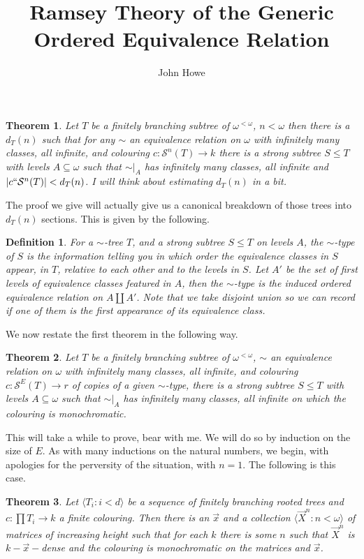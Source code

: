 \documentclass[a4paper,11pt]{article}
\author{John Howe}
\title{Ramsey Theory of the Generic Ordered Equivalence Relation}
\newtheorem{thm}{Theorem}
\newtheorem{defn}{Definition}
\begin{document}
\maketitle
\begin{thm}
Let $T$ be a finitely branching subtree of $\omega ^{<\omega}$, $n<\omega$ then there is a $d_T(n)$ such that for any $\sim$ an equivalence relation on $\omega$ with infinitely many classes, all infinite, and colouring $c: \mathcal{S}^n(T) \to k$ there is a strong subtree $S\leq T$ with levels $A\subseteq \omega$ such that $\sim |_A$ has infinitely many classes, all infinite and $|c``\mathcal{S}^n(T)|<d_T(n)$. I will think about estimating $d_T(n)$ in a bit.
\end{thm}
The proof we give will actually give us a canonical breakdown of those trees into $d_T(n)$ sections. This is given by the following.
\begin{defn}
For a $\sim $-tree $T$, and a strong subtree $S \leq T$ on levels $A$, the $\sim$-type of $S$ is the information telling you in which order the equivalence classes in $S$ appear, in $T$, relative to each other and to the levels in $S$. Let $A'$ be the set of first levels of equivalence classes featured in $A$, then the $\sim$-type is the induced ordered equivalence relation on $A\coprod A'$. Note that we take disjoint union so we can record if one of them is the first appearance of its equivalence class.
\end{defn}
We now restate the first theorem in the following way.
\begin{thm}
Let $T$ be a finitely branching subtree of $\omega ^{<\omega}$, $\sim$ an equivalence relation on $\omega$ with infinitely many classes, all infinite, and colouring $c: \mathcal{S}^E(T) \to r$ of copies of a given $\sim$-type, there is a strong subtree $S\leq T$ with levels $A\subseteq \omega$ such that $\sim |_A$ has infinitely many classes, all infinite on which the colouring is monochromatic.
\end{thm}
This will take a while to prove, bear with me. We will do so by induction on the size of $E$. As with many inductions on the natural numbers, we begin, with apologies for the perversity of the situation, with $n=1$. The following is this case.
\begin{thm}
Let $\langle T_i : i<d \rangle$ be a sequence of finitely branching rooted trees and $c: \prod T_i \to k$ a finite colouring. Then there is an $\vec{x}$ and a collection $\langle \vec{X}^n : n<\omega \rangle$ of matrices of increasing height such that for each $k$ there is some $n$ such that $\vec{X}^n$ is $k-\vec{x}-$dense and the colouring is monochromatic on the matrices and $\vec{x}$.
\end{thm}
\end{document}
